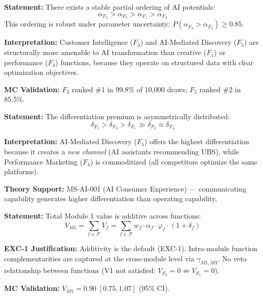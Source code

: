 \begin{tcolorbox}[colback=gray!5!white, colframe=gray!75!black,
    title=Axiom AIM-3: AI Potential Ordering]
\label{ax:aim-3}

\textbf{Statement:}
There exists a stable partial ordering of AI potentials:
\begin{equation}
\alpha_{F_3} > \alpha_{F_5} > \alpha_{F_1} > \alpha_{F_4}
\label{eq:aim-ordering}
\end{equation}
This ordering is robust under parameter uncertainty:
$P(\alpha_{F_3} > \alpha_{F_5}) \geq 0.85$.

\textbf{Interpretation:} Customer Intelligence ($F_3$) and AI-Mediated Discovery
($F_5$) are structurally more amenable to AI transformation than creative ($F_1$)
or performance ($F_4$) functions, because they operate on structured data
with clear optimization objectives.

\textbf{MC Validation:} $F_3$ ranked \#1 in 99.8\% of 10,000 draws;
$F_5$ ranked \#2 in 85.5\%.
\end{tcolorbox}


\begin{tcolorbox}[colback=gray!5!white, colframe=gray!75!black,
    title=Axiom AIM-4: Differentiation Asymmetry]
\label{ax:aim-4}

\textbf{Statement:}
The differentiation premium is asymmetrically distributed:
\begin{equation}
\delta_{F_5} > \delta_{F_3} > \delta_{F_1} \gg \delta_{F_2} \approx \delta_{F_4}
\label{eq:aim-diff-asymmetry}
\end{equation}

\textbf{Interpretation:} AI-Mediated Discovery ($F_5$) offers the highest
differentiation because it creates a \emph{new channel} (AI assistants recommending
UBS), while Performance Marketing ($F_4$) is commoditized (all competitors
optimize the same platforms).

\textbf{Theory Support:} MS-AI-001 (AI Consumer Experience) --- communicating
capability generates higher differentiation than operating capability.
\end{tcolorbox}


\begin{tcolorbox}[colback=gray!5!white, colframe=gray!75!black,
    title=Axiom AIM-5: Total Value Additivity]
\label{ax:aim-5}

\textbf{Statement:}
Total Module 1 value is additive across functions:
\begin{equation}
V_{M1} = \sum_{f \in \mathcal{F}} V_f = \sum_{f \in \mathcal{F}} w_f \cdot \alpha_f \cdot \varphi_f \cdot (1 + \delta_f)
\label{eq:aim-m1-total}
\end{equation}

\textbf{EXC-1 Justification:} Additivity is the default (EXC-1).
Intra-module function complementarities are captured at the cross-module
level via $\gamma_{M1, M3}$. No veto relationship between functions
(V1 not satisfied: $V_{F_3} = 0 \not\Rightarrow V_{F_1} = 0$).

\textbf{MC Validation:} $V_{M1} = 0.90 \; [0.75, 1.07]$ (95\% CI).
\end{tcolorbox}



